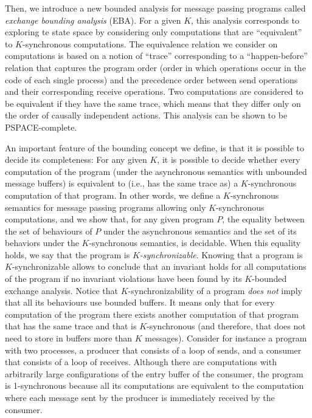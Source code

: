 Then, we introduce a new bounded analysis for message passing programs called {\em exchange bounding analysis} (EBA). For a given $K$, this analysis corresponds to exploring te state space by considering only computations that are “equivalent” to $K$-synchronous computations. The equivalence relation we consider on computations is based on a notion of “trace” corresponding to a “happen-before” relation that captures the program order (order in which operations occur in the code of each single process) and the precedence order between send operations and their corresponding receive operations. Two computations are considered to be equivalent if they have the same trace, which means that they differ only on the order of causally independent actions. This analysis can be shown to be PSPACE-complete. 
%

An important feature of the bounding concept we define, is that it is possible to decide its completeness: For any given $K$, it is possible to decide whether every computation of the program (under the asynchronous semantics with unbounded message buffers) is equivalent to (i.e., has the same trace as) a $K$-synchronous computation of that program. 
In other words, we define a $K$-synchronous semantics for message passing programs allowing only $K$-synchronous computations, and we show that, for any given program $P$, the equality between the set of behaviours of $P$ under the asynchronous semantics and the set of its behaviors under the $K$-synchronous semantics, is decidable. When this equality holds, we say that the program is {\em $K$-synchronizable}. Knowing that a program is $K$-synchronizable allows to conclude that an invariant holds for all computations of the program if no invariant violations have been found by its $K$-bounded exchange analysis. Notice that $K$-synchronizability of a program {\em does not} imply that all its behaviours use bounded buffers. It means only that for every computation of the program there exists another computation of that program that has the same trace and that is $K$-synchronous (and therefore, that does not need to store in  buffers more than $K$ messages). Consider for instance a program with two processes, a producer that consists of a loop of sends, and a consumer that consists of a loop of receives. Although there are computations with arbitrarily large configurations of the entry buffer of the consumer, the program is 1-synchronous because all its computations are equivalent to the computation where each message sent by the producer is immediately received by the consumer. 

